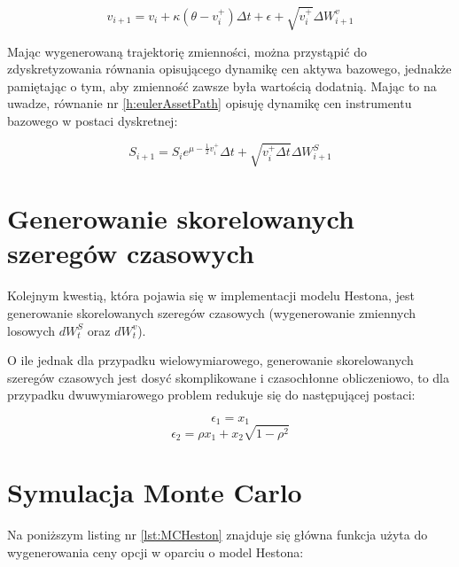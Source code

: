 \documentclass{pracamgr}
\begin{document}
\begin{equation}\label{h:eulerNonZero}
v_{i+1}  = v_i + \kappa (\theta - v_i^+) \Delta t + \epsilon +  \sqrt{v_i^+} \Delta W^{v}_{i+1}
\end{equation}

Mając wygenerowaną trajektorię zmienności, można przystąpić do zdyskretyzowania równania opisującego 
dynamikę cen aktywa bazowego, jednakże pamiętając o tym, aby zmienność zawsze była wartością dodatnią. 
Mając to na uwadze, równanie nr \ref{h:eulerAssetPath} opisuję dynamikę cen instrumentu bazowego w postaci dyskretnej:

\begin{equation}\label{h:eulerAssetPath}
S_{i+1} = S_i e^{\mu - \frac{1}{2} v_i^+} \Delta t + \sqrt{v_i^+ \Delta t}  \Delta W_{i+1}^S
\end{equation}
  
\section{Generowanie skorelowanych szeregów czasowych}

Kolejnym kwestią, która pojawia się w implementacji modelu Hestona, jest generowanie skorelowanych 
szeregów czasowych (wygenerowanie zmiennych losowych $dW^S_t$ oraz $dW^v_t$). 


O ile jednak dla przypadku wielowymiarowego, generowanie skorelowanych szeregów czasowych jest dosyć
skomplikowane i czasochłonne obliczeniowo, to dla przypadku dwuwymiarowego problem redukuje się do 
następującej postaci:

\begin{equation}
  \epsilon_1 = x_1
\end{equation}
\begin{equation}
  \epsilon_2 = \rho x_1 + x_2 \sqrt{1-\rho^2}
\end{equation}



\section{Symulacja Monte Carlo}


Na poniższym listing nr \ref{lst:MCHeston} znajduje się główna funkcja użyta do wygenerowania ceny 
opcji w oparciu o model Hestona:

\end{document}

